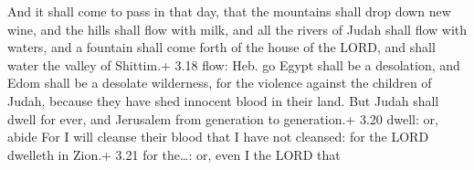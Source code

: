  And it shall come to pass in that day, that the
mountains shall drop down new wine, and the hills shall flow with milk,
and all the rivers of Judah shall flow with waters, and a fountain shall
come forth of the house of the LORD, and shall water the valley of
Shittim.+ 3.18 flow: Heb. go  Egypt shall be a desolation,
and Edom shall be a desolate wilderness, for the violence against the
children of Judah, because they have shed innocent blood in their land.
 But Judah shall dwell for ever, and Jerusalem from
generation to generation.+ 3.20 dwell: or, abide  For I
will cleanse their blood that I have not cleansed: for the LORD dwelleth
in Zion.+ 3.21 for the\ldots: or, even I the LORD that
